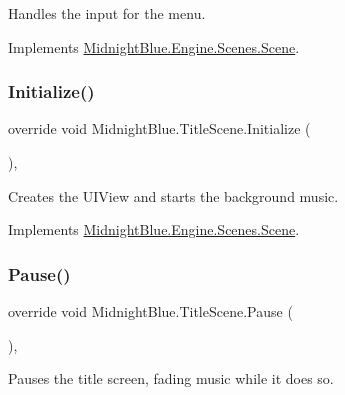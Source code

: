 Handles the input for the menu. 



Implements \hyperlink{class_midnight_blue_1_1_engine_1_1_scenes_1_1_scene_a2f7849ef8976f9aeed0023448033b6fd}{Midnight\+Blue.\+Engine.\+Scenes.\+Scene}.

\hypertarget{class_midnight_blue_1_1_title_scene_a793aa8253fba8d62a4ee19f042b22891}{}\label{class_midnight_blue_1_1_title_scene_a793aa8253fba8d62a4ee19f042b22891} 
\subsubsection{\texorpdfstring{Initialize()}{Initialize()}}
{\footnotesize\ttfamily override void Midnight\+Blue.\+Title\+Scene.\+Initialize (\begin{DoxyParamCaption}{ }\end{DoxyParamCaption})\hspace{0.3cm}{\ttfamily [inline]}, {\ttfamily [virtual]}}



Creates the U\+I\+View and starts the background music. 



Implements \hyperlink{class_midnight_blue_1_1_engine_1_1_scenes_1_1_scene_aa919101862c14384b955d91a4d3362ab}{Midnight\+Blue.\+Engine.\+Scenes.\+Scene}.

\hypertarget{class_midnight_blue_1_1_title_scene_a046934bfa3290d443b58bcc1de0919db}{}\label{class_midnight_blue_1_1_title_scene_a046934bfa3290d443b58bcc1de0919db} 
\subsubsection{\texorpdfstring{Pause()}{Pause()}}
{\footnotesize\ttfamily override void Midnight\+Blue.\+Title\+Scene.\+Pause (\begin{DoxyParamCaption}{ }\end{DoxyParamCaption})\hspace{0.3cm}{\ttfamily [inline]}, {\ttfamily [virtual]}}



Pauses the title screen, fading music while it does so. 



